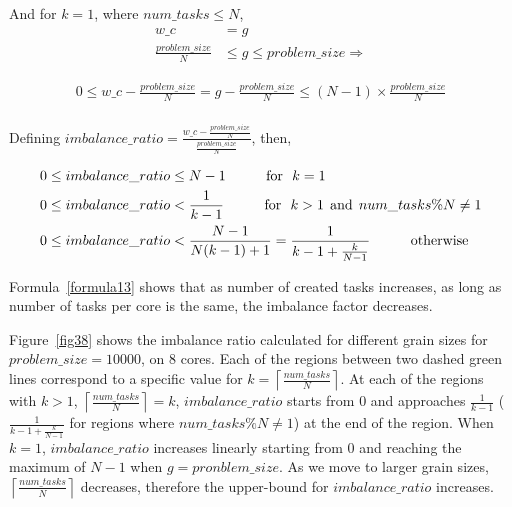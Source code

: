 And for $k=1$, where $num\_{tasks}\leq{N}$,
\begin{align*}\label{formula12}
w\_c&=g\\
\frac{problem\_{size}}{N}&\leq{g}\leq{problem\_{size}}\Rightarrow
\end{align*}

\begin{equation}\label{formula14}
\begin{aligned}
0\leq{w\_c-\frac{problem\_{size}}{N}}={g-\frac{problem\_{size}}{N}}\leq(N-1)\times{\frac{problem\_{size}}{N}}\\
\end{aligned}
\end{equation}


Defining $imbalance\_{ratio}=\frac{w\_c-\frac{problem\_{size}}{N}}{\frac{problem\_{size}}{N}}$, then,

\begin{equation}\label{formula13}
\begin{aligned}
0&\leq{imbalance\_{ratio}}\leq{N-1}  \text{\:\:\:\:\:\:\:\:\:\:\:\:\:for\:\:\:}k={1}\\
0&\leq{imbalance\_{ratio}}<\frac{1}{k-1}  \text{\:\:\:\:\:\:\:\:\:\:\:\:\:for\:\:\:}k>{1} \text{\:\:and\:\:}num\_{tasks}\%{N}\neq{1}\\
0&\leq{imbalance\_{ratio}}<\frac{N-1}{N(k-1)+1}=\frac{1}{k-1+\frac{k}{N-1}}\text{\:\:\:\:\:\:\:\:\:\:\:\:\:otherwise}
\end{aligned}
\end{equation}

Formula~\ref{formula13} shows that as number of created tasks increases, as long as number of tasks per core is the same, the imbalance factor decreases. 

\vspace{\baselineskip}

Figure~\ref{fig38} shows the imbalance ratio calculated for different grain sizes for $problem\_size=10000$, on 8 cores. Each of the regions between two dashed green lines correspond to a specific value for $k=\left\lceil{\frac{num\_{tasks}}{N}}\right \rceil$. 
At each of the regions with $k>1$, $\left\lceil{\frac{num\_{tasks}}{N}}\right \rceil=k$,  $imbalance\_{ratio}$ starts from $0$ and approaches $\frac{1}{k-1}$ ($\frac{1}{k-1+\frac{k}{N-1}}$ for regions where $num\_{tasks}\%{N}\neq{1}$) at the end of the region. When $k=1$, $imbalance\_{ratio}$ increases linearly starting from 0 and reaching the maximum of $N-1$ when $g=pronblem\_{size}$. As we move to larger grain sizes, $\left\lceil{\frac{num\_{tasks}}{N}}\right \rceil$ decreases, therefore the upper-bound for $imbalance\_{ratio}$ increases.   


